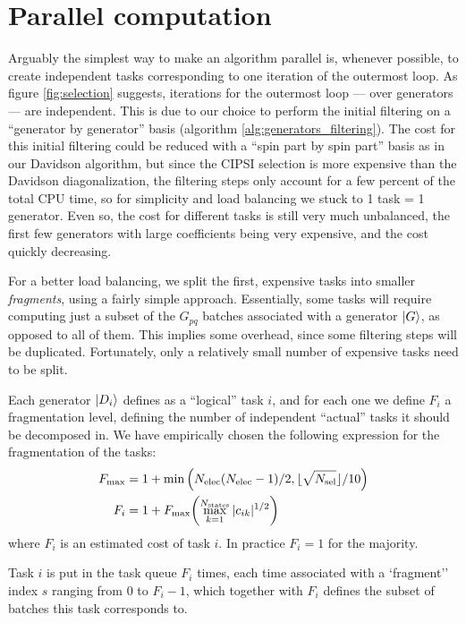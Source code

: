 \documentclass[./thesis.tex]{subfiles}
\begin{document}
\clearpage
\section{Parallel computation}
\label{seq:fragmentation}
Arguably the simplest way to make an algorithm parallel is, whenever possible, to create independent tasks corresponding to one iteration of the outermost loop.
As figure \ref{fig:selection} suggests, iterations for the outermost loop --- over generators --- are independent. This is due to our choice to perform the initial filtering on a ``generator by generator'' basis (algorithm \ref{alg:generators_filtering}). The cost for this initial filtering could be reduced with a ``spin part by spin part'' basis as in our Davidson algorithm, but since the CIPSI selection is more expensive than the Davidson diagonalization, the filtering steps only account for a few percent of the total CPU time, so for simplicity and load balancing we stuck to 1 task = 1 generator. Even so, the cost for different tasks is still very much unbalanced, the first few generators with large coefficients being very expensive, and the cost quickly decreasing.

For a better load balancing, we split the first, expensive tasks into smaller \emph{fragments}, using a fairly simple approach. Essentially, some tasks will require computing just a subset of the ${G_{pq}}$ batches associated with a generator $\ket G$, as opposed to all of them. This implies some overhead, since some filtering steps will be duplicated. Fortunately, only a relatively small number of expensive tasks need to be split.


Each generator $\ket {D_i}$ defines as a ``logical'' task $i$, and for each one we define $F_i$ a fragmentation level, defining the number of independent ``actual'' tasks it should be decomposed in.
We have empirically chosen the following expression for the fragmentation of the tasks:
\begin{align}
F_{\max} & = 1 + \min \qty( {N_\text{elec}} ({N_\text{elec}}-1)/2, \lfloor \sqrt{{N_\text{sel}}} \rfloor/10 ) \\
F_i & = 1 + F_{\max} \qty( \max_{k=1}^{{N_\text{states}}} |c_{ik}|^{1/2} )
\end{align}
where $F_i$ is an estimated cost of task $i$. In practice $F_i = 1$ for the majority.

Task $i$ is put in the task queue $F_i$ times, each time associated with a `fragment'' index $s$ ranging from $0$ to $F_i-1$, which together with $F_i$ defines the subset of batches this task corresponds to.
 
\end{document}
